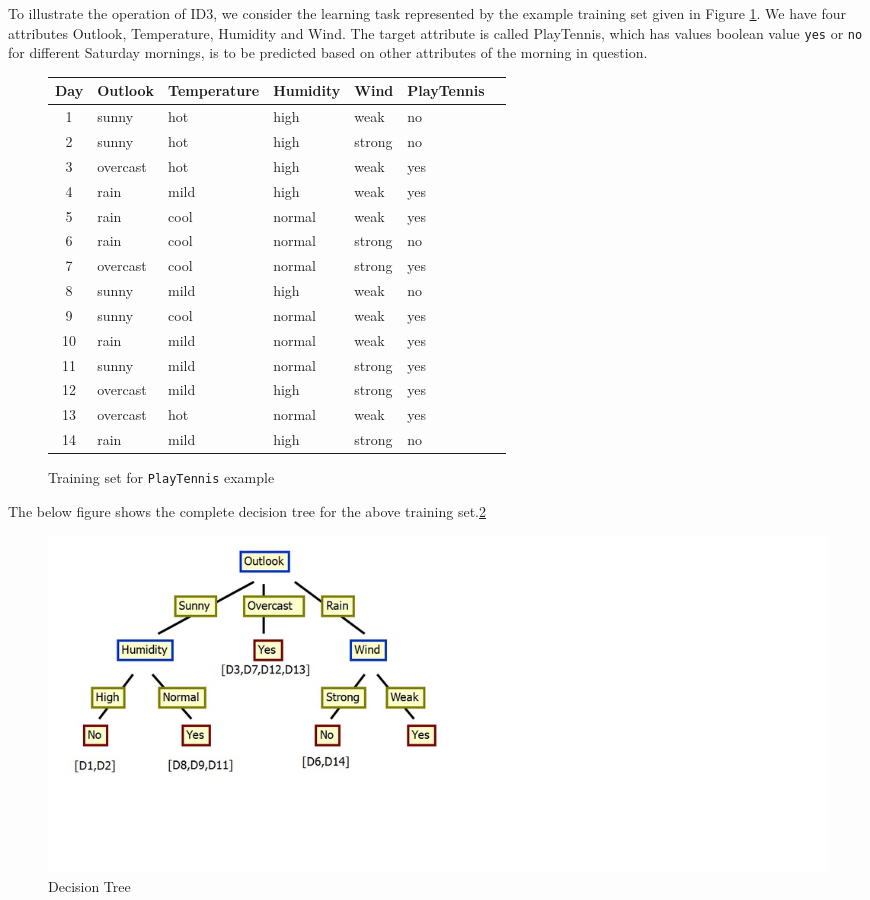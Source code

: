 \documentclass{report}
\begin{document}
To illustrate the operation of ID3, we consider the learning task represented by the example training set given in Figure \ref{fig:trainingplaytennis}. We have four attributes Outlook, Temperature, Humidity and Wind. The target attribute is called PlayTennis, which has values boolean value \texttt{yes} or \texttt{no} for different Saturday mornings, is to be predicted based on other attributes of the morning in question.
\begin{figure}[h]
  \centering
  \begin{tabular}{|c|l|l|l|l|l|l|}
    \hline
    Day & Outlook & Temperature & Humidity & Wind & PlayTennis\\
    \hline
    1 & sunny & hot & high & weak & no
    \\\hline
    2 & sunny & hot & high & strong & no
    \\\hline
    3 & overcast & hot & high & weak & yes
    \\\hline
    4 & rain & mild & high & weak & yes
    \\\hline
    5 & rain & cool & normal & weak & yes
    \\\hline
    6 & rain & cool & normal & strong & no
    \\\hline
    7 & overcast & cool & normal & strong & yes
    \\\hline
    8 & sunny & mild & high & weak & no
    \\\hline
    9 & sunny & cool & normal & weak & yes
    \\\hline
    10 & rain & mild & normal & weak & yes
    \\\hline
    11 & sunny & mild & normal & strong & yes
    \\\hline
    12 & overcast & mild & high & strong & yes
    \\\hline
    13 & overcast & hot & normal & weak & yes
    \\\hline
    14 & rain & mild & high & strong & no
    \\\hline
  \end{tabular}
  \caption{Training set for \texttt{PlayTennis} example}
  \label{fig:trainingplaytennis}
\end{figure}

The below figure shows the complete decision tree for the above training set.\ref{fig:decisiontree}

\begin{figure}[h]
\centering
\includegraphics[bb=0 0 1360 588,scale=0.5,keepaspectratio=true]{DecisionTree.jpg}
\caption{Decision Tree}
\label{fig:decisiontree}
\end{figure}
\end{document}
